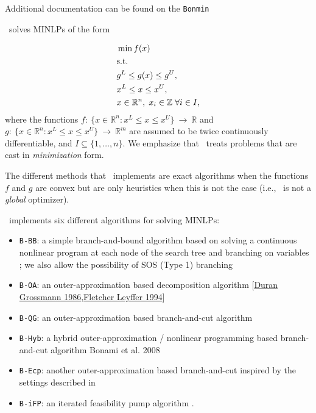 Additional documentation can be found on the {\tt Bonmin}


\Bonmin\ solves MINLPs of the form

\begin{align*}
&\min f(x) \\
& {\rm s.t.} \\
&g^L \leq g(x) \leq g^U,\\
& x^L \leq x \leq x^U, \\
&x \in \mathbb{R}^n, \;  x_i \in \mathbb{Z} \; \forall i \in I,
\end{align*}
where the functions $f :~\{x\in \mathbb{R}^n : x^L \leq x \leq x^U
\}~ \rightarrow~\mathbb{R}$ and $g:~\{x\in \mathbb{R}^n : x^L \leq x
\leq x^U \}~\rightarrow~\mathbb{R}^m$ are assumed to be twice
continuously differentiable, and $I \subseteq \{1, \ldots,n \}$. We
emphasize that \Bonmin\ treats problems that are cast
in {\em minimization} form.

The different methods that \Bonmin\ implements are exact algorithms when the functions $f$ and $g$ are
convex but are only heuristics when this is not the case (i.e., \Bonmin\ is not a \emph{global} optimizer).

\Bonmin\ implements six different algorithms for solving
MINLPs:

\begin{itemize}
\item {\tt B-BB}: a simple branch-and-bound algorithm based on solving
a continuous nonlinear program at each node of the search tree and
branching on variables ;
we also allow the possibility of SOS (Type 1) branching
\item {\tt B-OA}: an outer-approximation based decomposition algorithm
{[\href{\DGLink}{Duran Grossmann 1986},\href{\FLLink}{Fletcher Leyffer 1994}]}
\item {\tt B-QG}: an outer-approximation based branch-and-cut
algorithm
\item {\tt B-Hyb}: a hybrid outer-approximation / nonlinear programming
based branch-and-cut algorithm 
{\BetalLink}{Bonami et al. 2008}
\item {\tt B-Ecp}: another outer-approximation based branch-and-cut inspired
by the settings described in 
\item {\tt B-iFP}: an iterated feasibility pump algorithm .
\end{itemize}

